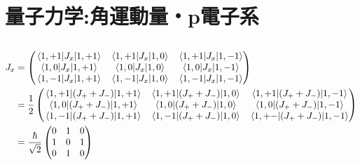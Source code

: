 \documentclass[../ap_2012.tex]{subfiles}
\begin{document}
\setcounter{chapter}{0}
\chapter{量子力学:角運動量・p電子系}
\section{}
\begin{equation}\begin{aligned}[b]
    J_x &= \begin{pmatrix}
        \mel{1,+1}{J_x}{1,+1} & \mel{1,+1}{J_x}{1,0} & \mel{1,+1}{J_x}{1,-1}\\
        \mel{1,0}{J_x}{1,+1} & \mel{1,0}{J_x}{1,0} & \mel{1,0}{J_x}{1,-1}\\
        \mel{1,-1}{J_x}{1,+1} & \mel{1,-1}{J_x}{1,0} & \mel{1,-1}{J_x}{1,-1}
    \end{pmatrix}\\
    &= \frac{1}{2}\begin{pmatrix}
        \mel{1,+1}{(J_++J_-)}{1,+1} & \mel{1,+1}{(J_++J_-)}{1,0} & \mel{1,+1}{(J_++J_-)}{1,-1}\\
        \mel{1,0}{(J_++J_-)}{1,+1} & \mel{1,0}{(J_++J_-)}{1,0} & \mel{1,0}{(J_++J_-)}{1,-1}\\
        \mel{1,-1}{(J_++J_-)}{1,+1} & \mel{1,-1}{(J_++J_-)}{1,0} & \mel{1,+-}{(J_++J_-)}{1,-1}
    \end{pmatrix}\\
    &= \frac{\hbar}{\sqrt{2}}\begin{pmatrix}
        0 & 1 & 0\\
        1 & 0 & 1\\
        0 & 1 & 0
    \end{pmatrix}
\end{aligned}\end{equation}
\end{document}
